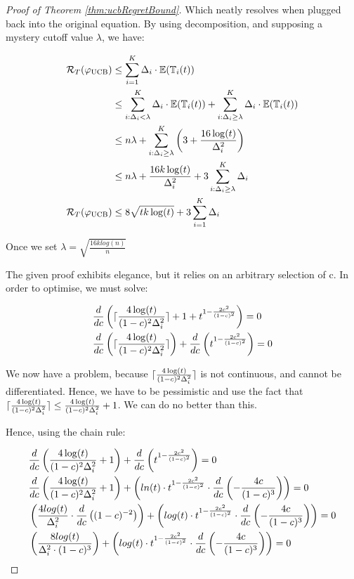 \begin{proof}[Proof of Theorem \ref{thm:ucbRegretBound}]
Which neatly resolves when plugged back into the original equation. By using decomposition, and supposing a mystery cutoff value $\lambda$, we have:

\begin{align*}
\mathcal{R}_{T}(\varphi_{\mathrm{UCB}}) &\leq \sum_{i=1}^{K} \Delta_{i} \cdot \mathbb{E}(\mathbb{T}_{i}(t)) \\
&\leq \sum_{i: \Delta_{i} < \lambda}^{K} \Delta_{i} \cdot \mathbb{E}(\mathbb{T}_{i}(t)) + \sum_{i: \Delta_{i} \geq \lambda}^{K} \Delta_{i} \cdot \mathbb{E}(\mathbb{T}_{i}(t)) \\
&\leq n \lambda + \sum_{i: \Delta_{i} \geq \lambda}^{K} \left( 3 + \frac{16\log(t)}{\Delta_{i}^2} \right)  \\
&\leq n \lambda + \frac{16k\log(t)}{\Delta_{i}^2} + 3 \sum_{i: \Delta_{i} \geq \lambda}^{K} \Delta_{i} \\
\mathcal{R}_{T}(\varphi_{\mathrm{UCB}}) &\leq 8 \sqrt{tk \log(t)} + 3 \sum_{i=1}^{K} \Delta_{i} 
\end{align*}

Once we set $\lambda = \sqrt{\frac{16klog(n)}{n}}$ 

The given proof exhibits elegance, but it relies on an arbitrary selection of c. In order to optimise, we must solve:

\begin{align*}
& \frac{d}{dc} \left( \lceil \frac{4\log(t)}{(1-c)^2\Delta_{i}^2} \rceil + 1 + t^{1 - \frac{2c^2}{(1-c)^2}} \right) = 0 \\
& \frac{d}{dc} \left( \lceil \frac{4\log(t)}{(1-c)^2\Delta_{i}^2} \rceil \right) + \frac{d}{dc} \left(t^{1 - \frac{2c^2}{(1-c)^2}} \right) = 0 \\
\end{align*}

We now have a problem, because $\lceil \frac{4\log(t)}{(1-c)^2\Delta_{i}^2} \rceil$ is not continuous, and cannot be differentiated. Hence, we have to be pessimistic and use the fact that $\lceil \frac{4\log(t)}{(1-c)^2\Delta_{i}^2} \rceil \leq \frac{4\log(t)}{(1-c)^2\Delta_{i}^2} + 1$. We can do no better than this.

Hence, using the chain rule:

\begin{align*}
& \frac{d}{dc} \left( \frac{4\log(t)}{(1-c)^2\Delta_{i}^2} + 1\right) + \frac{d}{dc} \left(t^{1 - \frac{2c^2}{(1-c)^2}} \right) = 0 \\
& \frac{d}{dc} \left( \frac{4\log(t)}{(1-c)^2\Delta_{i}^2} + 1\right) + \left(ln(t) \cdot t^{1 - \frac{2c^2}{(1-c)^2}} \cdot \frac{d}{dc} \left( -\frac{4c}{(1-c)^3} \right) \right) = 0 \\
& \left( \frac{4log(t)}{\Delta_{i}^2} \cdot \frac{d}{dc} \left( (1-c)^{-2} \right) \right) + \left(log(t) \cdot t^{1 - \frac{2c^2}{(1-c)^2}} \cdot \frac{d}{dc} \left( -\frac{4c}{(1-c)^3} \right) \right) = 0 \\
& \left( \frac{8log(t)}{\Delta_{i}^2 \cdot (1-c)^3} \right) + \left(log(t) \cdot t^{1 - \frac{2c^2}{(1-c)^2}} \cdot \frac{d}{dc} \left( -\frac{4c}{(1-c)^3} \right) \right) = 0 \\
\end{align*}



\end{proof}
